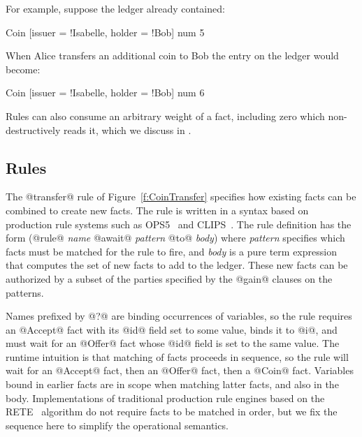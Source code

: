 For example, suppose the ledger already contained:
\begin{small}
\begin{code}
 Coin [issuer = !Isabelle, holder = !Bob]  num 5
\end{code}
\end{small}
%
When Alice transfers an additional coin to Bob the entry on the ledger would become:
\begin{small}
\begin{code}
 Coin [issuer = !Isabelle, holder = !Bob]  num 6
\end{code}
\end{small}
%
Rules can also consume an arbitrary weight of a fact, including zero which non-destructively reads it, which we discuss in \REF.



\subsection{Rules}
The @transfer@ rule of Figure~\ref{f:CoinTransfer} specifies how existing facts can be combined to create new facts. The rule is written in a syntax based on production rule systems such as OPS5~\cite{Forgy1981:OPS5} and CLIPS~\cite{Riley2017:CLIPS}. The rule definition has the form (@rule@ \emph{name} @await@ \emph{pattern} @to@ \emph{body}) where \emph{pattern} specifies which facts must be matched for the rule to fire, and \emph{body} is a pure term expression that computes the set of new facts to add to the ledger. These new facts can be authorized by a subset of the parties specified by the @gain@ clauses on the patterns.

Names prefixed by @?@ are binding occurrences of variables, so the rule requires an @Accept@ fact with its @id@ field set to some value, binds it to @i@, and must wait for an @Offer@ fact whose @id@ field is set to the same value. The runtime intuition is that matching of facts proceeds in sequence, so the rule will wait for an @Accept@ fact, then an @Offer@ fact, then a @Coin@ fact. Variables bound in earlier facts are in scope when matching latter facts, and also in the body. Implementations of traditional production rule engines based on the RETE~\cite{Forgy1981:RETE} algorithm do not require facts to be matched in order, but we fix the sequence here to simplify the operational semantics.

